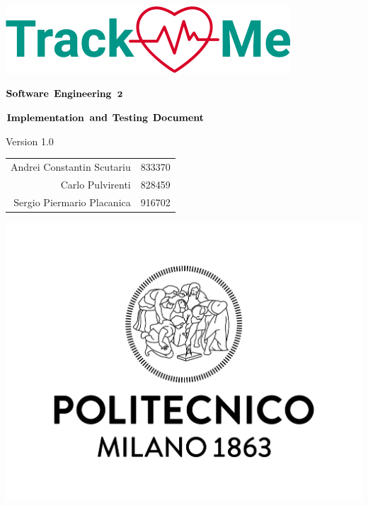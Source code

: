 \documentclass{article}
\author{
\and
\and
}
\date{}
\title{}
\begin{document}

\thispagestyle{empty} %
\begin{center}
	\includegraphics[scale=0.8]{images/logo.png}



	\vspace{3cm}

	\large $\bf \large Software$ $\bf Engineering$ $\bf 2$

	\vspace{3mm}

	\LARGE $\bf Implementation$  $\bf and$ $\bf Testing$ $\bf Document$

	\vspace{2mm}
	\small Version 1.0

	\vspace{1cm}

	\begin{tabular}{r|l}
		\large Andrei Constantin Scutariu & \large 833370\\
		\large Carlo Pulvirenti & \large 828459\\
		\large Sergio Piermario Placanica & \large 916702\\
	\end{tabular}

	\vspace{3cm}

	\includegraphics[scale=0.15]{images/logoPolimi.jpg}


\end{center}
\end{document}
